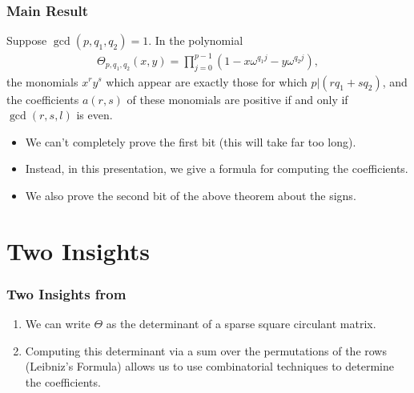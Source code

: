\documentclass{beamer}
\theoremstyle{plain}
\theoremstyle{definition}
\theoremstyle{remark}
\newcommand{\bee}{\begin{equation}\begin{aligned}}
\newcommand{\eee}{\end{aligned}\end{equation}}
\renewcommand{\'}{\hspace{0.5mm}'}		%
\begin{document}

\begin{frame}
\frametitle{Main Result}


\begin{theorem}
Suppose $\gcd(p,q_1,q_2) = 1$. In the polynomial
\bee
	\Theta_{p,q_1,q_2}(x,y)
	= 
	\prod_{j = 0}^{p - 1}(1 - x\omega^{q_1 j} - y\omega^{q_2 j}),
\eee
the monomials $x^ry^s$ which appear are exactly those for which $p|(rq_1 + sq_2)$, and the coefficients $a(r,s)$ of these monomials are positive if and only if $\gcd \left(r,s,l\right)$
 is even. 
\end{theorem}

\begin{itemize}
	\item We can't completely prove the first bit (this will
	take far too long). 
	\item Instead, in this presentation, 
	we give a formula for computing the coefficients. 
	\item We also prove the second bit of the above theorem about the signs. 
\end{itemize}

\end{frame}


\section{Two Insights}

\begin{frame}
\frametitle{Two Insights from \cite{Loehr2004}}

\begin{enumerate}
	\item We can write $\Theta$ as the determinant 
	of a sparse square circulant matrix. 
	\item Computing this determinant via a sum over the 
	permutations of the rows (Leibniz's Formula) allows us to use
	combinatorial techniques to determine the coefficients. 
\end{enumerate}

\end{frame}

\end{document}
